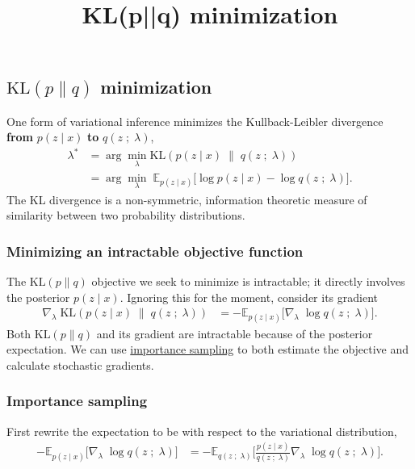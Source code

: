 \title{KL(p||q) minimization}

\subsection{$\text{KL}(p\|q)$ minimization}

One form of variational inference minimizes the Kullback-Leibler divergence
\textbf{from} $p(z \mid x)$ \textbf{to} $q(z\;;\;\lambda)$,
\begin{align*}
  \lambda^*
  &=
  \arg\min_\lambda \text{KL}(
  p(z \mid x)
  \;\|\;
  q(z\;;\;\lambda)
  )\\
  &=
  \arg\min_\lambda\;
  \mathbb{E}_{p(z \mid x)}
  \big[
  \log p(z \mid x)
  -
  \log q(z\;;\;\lambda)
  \big].
\end{align*}
The KL divergence is a non-symmetric, information theoretic measure of
similarity between two probability distributions.

\subsubsection{Minimizing an intractable objective function}

The $\text{KL}(p\|q)$ objective we seek to minimize is intractable; it directly
involves the posterior $p(z \mid x)$. Ignoring this for the moment, consider its
gradient
\begin{align*}
  \nabla_\lambda\;
  \text{KL}(
  p(z \mid x)
  \;\|\;
  q(z\;;\;\lambda)
  )
  &=
  -
  \mathbb{E}_{p(z \mid x)}
  \big[
  \nabla_\lambda\;
  \log q(z\;;\;\lambda)
  \big].
\end{align*}
Both $\text{KL}(p\|q)$ and its gradient are intractable
because of the posterior expectation.
We can use \href{tut_KLpq_ais.html}{importance sampling} to both
estimate the objective and calculate stochastic gradients.

\subsubsection{Importance sampling}

First rewrite the expectation to be with respect to the variational
distribution,
\begin{align*}
  -
  \mathbb{E}_{p(z \mid x)}
  \big[
  \nabla_\lambda\;
  \log q(z\;;\;\lambda)
  \big]
  &=
  -
  \mathbb{E}_{q(z\;;\;\lambda)}
  \Bigg[
  \frac{p(z \mid x)}{q(z\;;\;\lambda)}
  \nabla_\lambda\;
  \log q(z\;;\;\lambda)
  \Bigg].
\end{align*}

